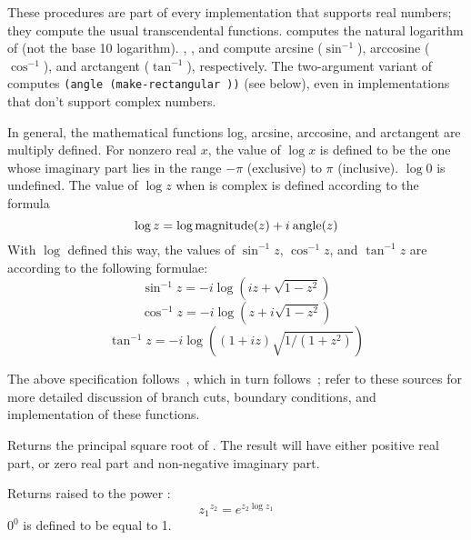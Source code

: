 \begin{entry}{%
}

These procedures are part of every implementation that supports real
numbers; they compute the usual transcendental functions.  
computes the natural logarithm of  (not the base 10 logarithm).
, , and  compute arcsine ($\sin^{-1}$),
arccosine ($\cos^{-1}$), and arctangent ($\tan^{-1}$), respectively.
The two-argument variant of  computes {\tt (angle
(make-rectangular  ))} (see below), even in implementations
that don't support complex numbers.

In general, the mathematical functions log, arcsine, arccosine, and
arctangent are multiply defined.
For nonzero real $x$, the value of $\log x$ is defined to be
the one whose imaginary part lies in the range $-\pi$ (exclusive) to
$\pi$ (inclusive).  $\log 0$ is undefined.  The value of $\log z$ when
 is complex is defined according to the formula
$$\log z = \log {\rm magnitude}(z) + i \: {\rm angle} (z)$$
With $\log$ defined this way, the values of $\sin^{-1} z$, $\cos^{-1} z$,
and $\tan^{-1} z$ are according to the following formulae:
$$\sin^{-1} z = -i \log (i z + \sqrt{1 - z^2})$$
$$\cos^{-1} z = -i \log (z + i \sqrt{1 - z^2})$$
$$\tan^{-1} z = -i \log ( (1 + i z) \sqrt{1/(1 + z^2)} )$$

The above specification follows~\cite{CLtL}, which in turn
follows~\cite{Penfield81}; refer to these sources for more detailed
discussion of branch cuts, boundary conditions, and implementation of
these functions.

\end{entry}


\begin{entry}{%
}

Returns the principal square root of .  The result will have
either positive real part, or zero real part and non-negative imaginary
part.
\end{entry}


\begin{entry}{%
}

Returns  raised to the power :
$${z_1}^{z_2} = e^{z_2 \log {z_1}}$$
$0^0$ is defined to be equal to 1.
\end{entry}


